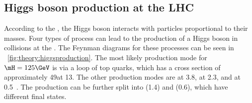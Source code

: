 \subsection{Higgs boson production at the LHC}
\label{sec:th:higgs_production_modes}

According to the \SM, the Higgs boson interacts with particles proportional to their masses. Four types of process can lead to the production of a Higgs boson in \pp collisions at the \LHC. The Feynman diagrams for these processes can be seen in \Fig~\ref{fig:theory:higgsproduction}. The most likely production mode for $\mH=125\GeV$ is \ggH via a loop of top quarks, which has a cross section of approximately 49\pb at 13\TeV. The other production modes are \VBF at 3.8\pb, \ZH at 2.3\pb, and \ttH at 0.5\pb~\cite{LHCHXSWGRY4}. The \ZH production can be further split into \WH (1.4\pb) and \ZH (0.6\pb), which have different final states.

